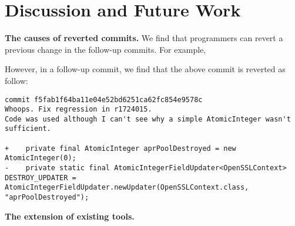 \section{Discussion and Future Work}
\noindent
\textbf{The causes of reverted commits.} We find that programmers can revert a previous change in the follow-up commits. For example,




However, in a follow-up commit, we find that the above commit is reverted as follow: 


\begin{lstlisting}
commit f5fab1f64ba11e04e52bd6251ca62fc854e9578c
Whoops. Fix regression in r1724015.
Code was used although I can't see why a simple AtomicInteger wasn't sufficient.

+    private final AtomicInteger aprPoolDestroyed = new AtomicInteger(0);
-    private static final AtomicIntegerFieldUpdater<OpenSSLContext> DESTROY_UPDATER = AtomicIntegerFieldUpdater.newUpdater(OpenSSLContext.class, "aprPoolDestroyed");
\end{lstlisting}


\noindent
\textbf{The extension of existing tools.} 